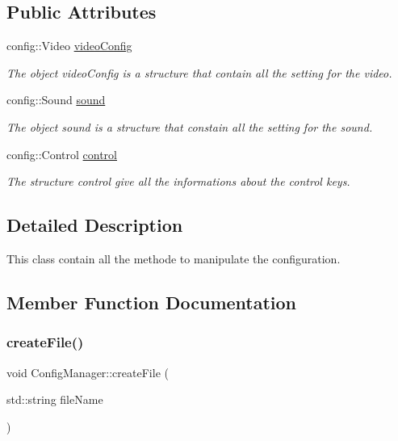 \subsection*{Public Attributes}
\begin{DoxyCompactItemize}
\item 
config\+::\+Video \hyperlink{classConfigManager_a1e0dbb8563b71871e6c68abce5620cd0}{video\+Config}
\begin{DoxyCompactList}\small\item\em The object video\+Config is a structure that contain all the setting for the video. \end{DoxyCompactList}\item 
config\+::\+Sound \hyperlink{classConfigManager_a010e2da02ebc90d7ce930d1c57a79e96}{sound}
\begin{DoxyCompactList}\small\item\em The object sound is a structure that constain all the setting for the sound. \end{DoxyCompactList}\item 
\mbox{\label{classConfigManager_abaade5dd62a670ad068376eb950e7168}} 
config\+::\+Control \hyperlink{classConfigManager_abaade5dd62a670ad068376eb950e7168}{control}
\begin{DoxyCompactList}\small\item\em The structure control give all the informations about the control keys. \end{DoxyCompactList}\end{DoxyCompactItemize}


\subsection{Detailed Description}
This class contain all the methode to manipulate the configuration. 

\subsection{Member Function Documentation}
\mbox{\label{classConfigManager_af78f80706b5a300a738c3fde04c9c91b}} 
\subsubsection{\texorpdfstring{create\+File()}{createFile()}}
{\footnotesize\ttfamily void Config\+Manager\+::create\+File (\begin{DoxyParamCaption}\item[{std\+::string}]{file\+Name }\end{DoxyParamCaption})}



